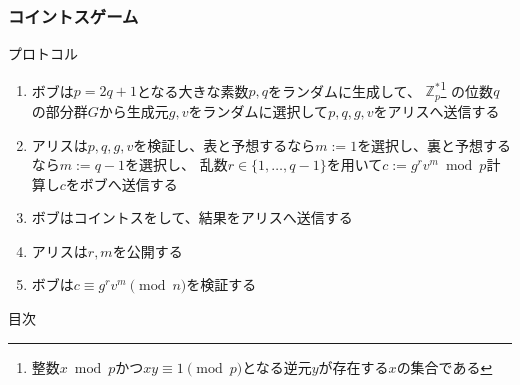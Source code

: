 \begin{frame}[fragile]
  \frametitle{コイントスゲーム}

  \begin{block}{プロトコル}
    \begin{enumerate}
      \item<2-> ボブは$p = 2q + 1$となる大きな素数$p, q$をランダムに生成して、
        $\mathbb{Z}^*_p$\footnote[frame]{整数$x \bmod p$かつ$xy \equiv 1 \pmod{p}$となる逆元$y$が存在する$x$の集合である}
        の位数$q$の部分群$G$から生成元$g, v$をランダムに選択して$p, q, g, v$をアリスへ送信する
      \item<3-> アリスは$p, q, g, v$を検証し、表と予想するなら$m := 1$を選択し、裏と予想するなら$m := q - 1$を選択し、
        乱数$r \in \{1, \dots, q - 1\}$を用いて$c := g^r v^m \bmod p$計算し$c$をボブへ送信する
      \item<4-> ボブはコイントスをして、結果をアリスへ送信する
      \item<5-> アリスは$r, m$を公開する
      \item<6-> ボブは$c \equiv g^r v^m \pmod{n}$を検証する
    \end{enumerate}
  \end{block}
\end{frame}

\begin{frame}{目次}
  \tableofcontents
\end{frame}


